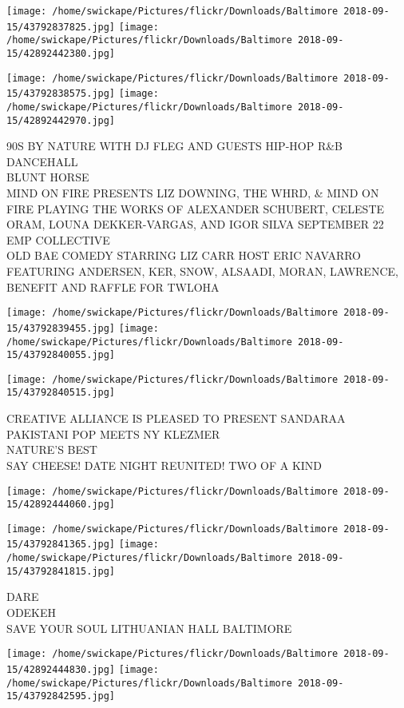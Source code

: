 \documentclass[10pt,letterpaper]{article}
\begin{document}
\texttt{[image: /home/swickape/Pictures/flickr/Downloads/Baltimore 2018-09-15/43792837825.jpg]}
\texttt{[image: /home/swickape/Pictures/flickr/Downloads/Baltimore 2018-09-15/42892442380.jpg]}

\texttt{[image: /home/swickape/Pictures/flickr/Downloads/Baltimore 2018-09-15/43792838575.jpg]}
\texttt{[image: /home/swickape/Pictures/flickr/Downloads/Baltimore 2018-09-15/42892442970.jpg]}

90S BY NATURE WITH DJ FLEG AND GUESTS HIP{-}HOP R\&B DANCEHALL\\
BLUNT HORSE\\
MIND ON FIRE PRESENTS LIZ DOWNING, THE WHRD, \& MIND ON FIRE PLAYING THE WORKS OF ALEXANDER SCHUBERT, CELESTE ORAM, LOUNA DEKKER{-}VARGAS, AND IGOR SILVA SEPTEMBER 22 EMP COLLECTIVE\\
OLD BAE COMEDY STARRING LIZ CARR HOST ERIC NAVARRO FEATURING ANDERSEN, KER, SNOW, ALSAADI, MORAN, LAWRENCE, BENEFIT AND RAFFLE FOR TWLOHA
\pagebreak

\texttt{[image: /home/swickape/Pictures/flickr/Downloads/Baltimore 2018-09-15/43792839455.jpg]}
\texttt{[image: /home/swickape/Pictures/flickr/Downloads/Baltimore 2018-09-15/43792840055.jpg]}

\texttt{[image: /home/swickape/Pictures/flickr/Downloads/Baltimore 2018-09-15/43792840515.jpg]}

CREATIVE ALLIANCE IS PLEASED TO PRESENT SANDARAA PAKISTANI POP MEETS NY KLEZMER\\
NATURE'S BEST\\
SAY CHEESE!  DATE NIGHT  REUNITED!  TWO OF A KIND
\pagebreak

\texttt{[image: /home/swickape/Pictures/flickr/Downloads/Baltimore 2018-09-15/42892444060.jpg]}

\vspace{0.25in}
\texttt{[image: /home/swickape/Pictures/flickr/Downloads/Baltimore 2018-09-15/43792841365.jpg]}
\texttt{[image: /home/swickape/Pictures/flickr/Downloads/Baltimore 2018-09-15/43792841815.jpg]}

DARE\\
ODEKEH\\
SAVE YOUR SOUL LITHUANIAN HALL BALTIMORE
\pagebreak

\texttt{[image: /home/swickape/Pictures/flickr/Downloads/Baltimore 2018-09-15/42892444830.jpg]}
\texttt{[image: /home/swickape/Pictures/flickr/Downloads/Baltimore 2018-09-15/43792842595.jpg]}
\end{document}
